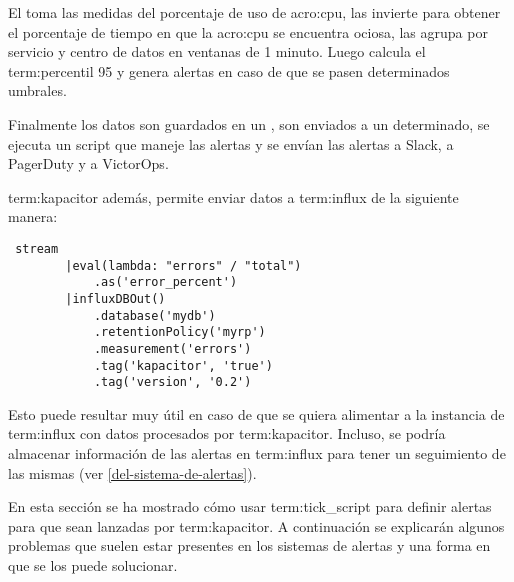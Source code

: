 El  toma las medidas del porcentaje de uso de \gls{acro:cpu}, las
invierte para obtener el porcentaje de tiempo en que la \gls{acro:cpu} se
encuentra ociosa, las agrupa por servicio y centro de datos en ventanas de 1
minuto. Luego calcula el \gls{term:percentil} 95 y genera alertas en caso de
que se pasen determinados umbrales.

Finalmente los datos son guardados en un , son enviados a un 
determinado, se ejecuta un script que maneje las alertas y se envían las alertas a Slack, a
PagerDuty y a VictorOps.

\gls{term:kapacitor} además, permite enviar datos a \gls{term:influx} de la
siguiente manera:

\begin{lstlisting}
 stream
        |eval(lambda: "errors" / "total")
            .as('error_percent')
        |influxDBOut()
            .database('mydb')
            .retentionPolicy('myrp')
            .measurement('errors')
            .tag('kapacitor', 'true')
            .tag('version', '0.2')
\end{lstlisting}


Esto puede resultar muy útil en caso de que se quiera alimentar a la
instancia de \gls{term:influx} con datos procesados por \gls{term:kapacitor}.
Incluso, se podría almacenar información de las alertas en \gls{term:influx}
para tener un seguimiento de las mismas (ver \autoref{del-sistema-de-alertas}).

En esta sección se ha mostrado cómo usar \gls{term:tick_script} para definir
alertas para que sean lanzadas por \gls{term:kapacitor}. A continuación
se explicarán algunos problemas que suelen estar presentes en los sistemas de
alertas y una forma en que se los puede solucionar.
